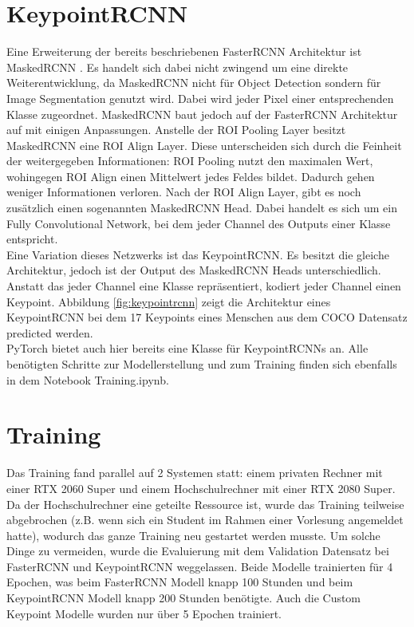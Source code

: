 \section{KeypointRCNN}\label{ch:keypointrcnn}
Eine Erweiterung der bereits beschriebenen FasterRCNN Architektur ist MaskedRCNN \cite{keypointrcnn}.
Es handelt sich dabei nicht zwingend um eine direkte Weiterentwicklung, da MaskedRCNN nicht für Object Detection sondern für Image Segmentation genutzt wird.
Dabei wird jeder Pixel einer entsprechenden Klasse zugeordnet.
MaskedRCNN baut jedoch auf der FasterRCNN Architektur auf mit einigen Anpassungen.
Anstelle der ROI Pooling Layer besitzt MaskedRCNN eine ROI Align Layer. 
Diese unterscheiden sich durch die Feinheit der weitergegeben Informationen: ROI Pooling nutzt den maximalen Wert, wohingegen ROI Align einen Mittelwert jedes Feldes bildet. 
Dadurch gehen weniger Informationen verloren.
Nach der ROI Align Layer, gibt es noch zusätzlich einen sogenannten MaskedRCNN Head.
Dabei handelt es sich um ein Fully Convolutional Network, bei dem jeder Channel des Outputs einer Klasse entspricht.\\
Eine Variation dieses Netzwerks ist das KeypointRCNN. 
Es besitzt die gleiche Architektur, jedoch ist der Output des MaskedRCNN Heads unterschiedlich.
Anstatt das jeder Channel eine Klasse repräsentiert, kodiert jeder Channel einen Keypoint. 
Abbildung \ref{fig:keypointrcnn} zeigt die Architektur eines KeypointRCNN bei dem 17 Keypoints eines Menschen aus dem COCO Datensatz predicted werden. \\
PyTorch bietet auch hier bereits eine Klasse für KeypointRCNNs an. 
Alle benötigten Schritte zur Modellerstellung und zum Training finden sich ebenfalls in dem Notebook Training.ipynb.


\section{Training}\label{ch:training}
Das Training fand parallel auf 2 Systemen statt: einem privaten Rechner mit einer RTX 2060 Super und einem Hochschulrechner mit einer RTX 2080 Super.
Da der Hochschulrechner eine geteilte Ressource ist, wurde das Training teilweise abgebrochen (z.B. wenn sich ein Student im Rahmen einer Vorlesung angemeldet hatte), wodurch das ganze Training neu gestartet werden musste.
Um solche Dinge zu vermeiden, wurde die Evaluierung mit dem Validation Datensatz bei FasterRCNN und KeypointRCNN weggelassen.
Beide Modelle trainierten für 4 Epochen, was beim FasterRCNN Modell knapp 100 Stunden und beim KeypointRCNN Modell knapp 200 Stunden benötigte. Auch die Custom Keypoint Modelle wurden nur über 5 Epochen trainiert.\\



